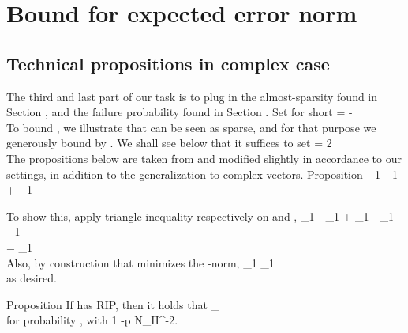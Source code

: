 \section {Bound for expected error norm}

\subsection {Technical propositions in complex case}

The third and last part of our task is to plug in the almost-sparsity found in Section , and the failure probability found in Section .
Set for short
%
 {
=  -  \\
}
%
To bound , we illustrate that  can be seen as sparse, and for that purpose we generously bound  by .
We shall see below that it suffices to set
%
 {
\g
= 2  \\
}
%
The propositions below are taken from \cite {CaT07} and modified slightly in accordance to our settings, in addition to the generalization to complex vectors.
%
\Result
{Proposition}
{
%
 {
 _1
\leq {} _1
+ _1 \\
}
}

To show this, apply triangle inequality respectively on  and ,
%
 {
 _1
-  _1
+  _1
-  _1
\leq {} _1 \\
%
= _1 \\
}
%
Also, by construction that  minimizes the -norm,
%
 {
 _1
\leq {} _1 \\
}
as desired.

%
\Result
{Proposition}
{
If  has  RIP, then it holds that
%
 {
 _\infty
{}  \\
}
%
for probability , with
%
 {
1 -p
\leq N_H^{-2}. \\
}
}

